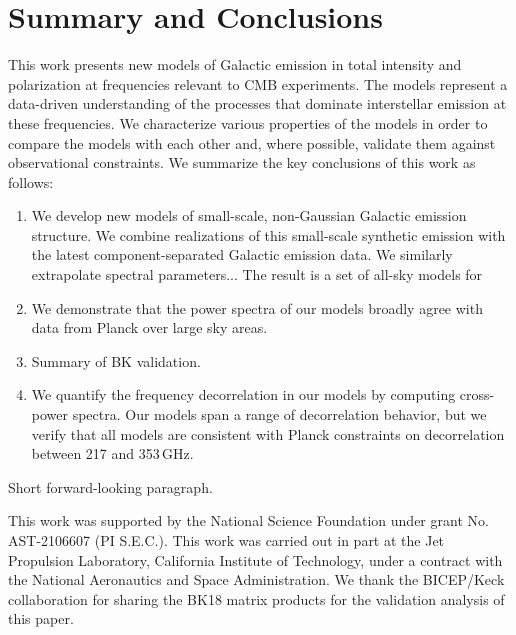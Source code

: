 \documentclass[twocolumn]{aastex631}
\begin{document}
\section{Summary and Conclusions} \label{sec:summary}

This work presents new models of Galactic emission in total intensity and polarization at frequencies relevant to CMB experiments. The models represent a data-driven understanding of the processes that dominate interstellar emission at these frequencies. We characterize various properties of the models in order to compare the models with each other and, where possible, validate them against observational constraints. We summarize the key conclusions of this work as follows:

\begin{enumerate}
    \item We develop new models of small-scale, non-Gaussian Galactic emission structure. We combine realizations of this small-scale synthetic emission with the latest component-separated Galactic emission data. We similarly extrapolate spectral parameters... The result is a set of all-sky models for   
    \item We demonstrate that the power spectra of our models broadly agree with data from Planck over large sky areas. 
    \item Summary of BK validation.
    \item We quantify the frequency decorrelation in our models by computing cross-power spectra. Our models span a range of decorrelation behavior, but we verify that all models are consistent with Planck constraints on decorrelation between 217 and 353\,GHz. 
    
\end{enumerate}

Short forward-looking paragraph.

\begin{acknowledgments}

This work was supported by the National Science Foundation under grant No. AST-2106607 (PI S.E.C.). This work was carried out in part at the Jet Propulsion Laboratory, California Institute of Technology, under a contract with the National Aeronautics and Space Administration. We thank the BICEP/Keck collaboration for sharing the BK18 matrix products for the validation analysis of this paper. 

\end{acknowledgments}


\end{document}
